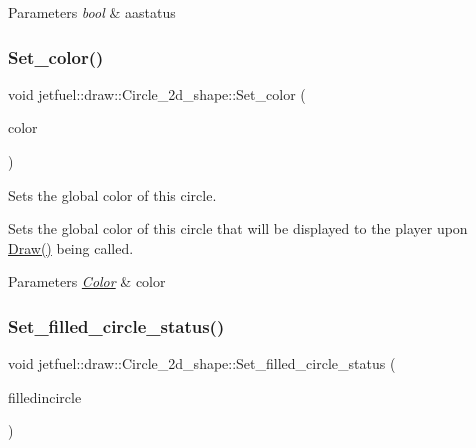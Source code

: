 \begin{DoxyParams}{Parameters}
{\em bool} & aastatus \\
\hline
\end{DoxyParams}
\mbox{\label{classjetfuel_1_1draw_1_1Circle__2d__shape_a20ac0647e90c629f347e3c65a0315220}} 
\subsubsection{\texorpdfstring{Set\+\_\+color()}{Set\_color()}}
{\footnotesize\ttfamily void jetfuel\+::draw\+::\+Circle\+\_\+2d\+\_\+shape\+::\+Set\+\_\+color (\begin{DoxyParamCaption}\item[{const \hyperlink{classjetfuel_1_1draw_1_1Color}{Color}}]{color }\end{DoxyParamCaption})\hspace{0.3cm}{\ttfamily [inline]}}



Sets the global color of this circle. 

Sets the global color of this circle that will be displayed to the player upon \hyperlink{classjetfuel_1_1draw_1_1Circle__2d__shape_a8be660f3cd624dc077d9003ee3b37212}{Draw()} being called.


\begin{DoxyParams}{Parameters}
{\em \hyperlink{classjetfuel_1_1draw_1_1Color}{Color}} & color \\
\hline
\end{DoxyParams}
\mbox{\label{classjetfuel_1_1draw_1_1Circle__2d__shape_a027d4640ee52708f5fa853f20ba2f899}} 
\subsubsection{\texorpdfstring{Set\+\_\+filled\+\_\+circle\+\_\+status()}{Set\_filled\_circle\_status()}}
{\footnotesize\ttfamily void jetfuel\+::draw\+::\+Circle\+\_\+2d\+\_\+shape\+::\+Set\+\_\+filled\+\_\+circle\+\_\+status (\begin{DoxyParamCaption}\item[{const bool}]{filledincircle }\end{DoxyParamCaption})\hspace{0.3cm}{\ttfamily [inline]}}



